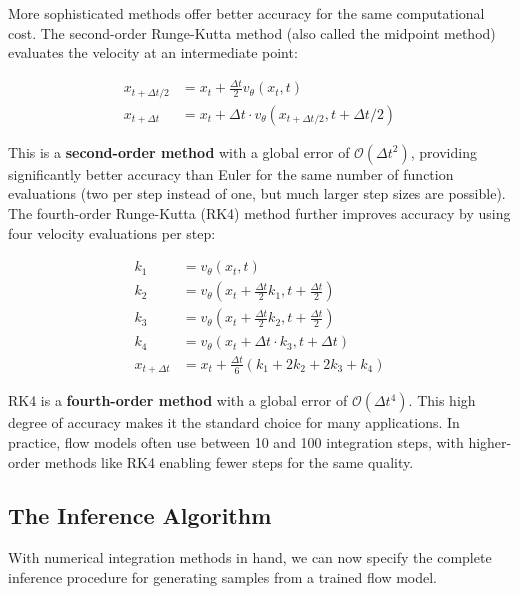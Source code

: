 \documentclass{book}
\begin{document}
More sophisticated methods offer better accuracy for the same computational cost. The second-order Runge-Kutta method (also called the midpoint method) evaluates the velocity at an intermediate point:

\begin{equation}
\begin{aligned}
x_{t + \Delta t/2} &= x_t + \frac{\Delta t}{2} v_\theta(x_t, t) \\
x_{t + \Delta t} &= x_t + \Delta t \cdot v_\theta(x_{t + \Delta t/2}, t + \Delta t/2)
\end{aligned}
\end{equation}

This is a \textbf{second-order method} with a global error of $\mathcal{O}(\Delta t^2)$, providing significantly better accuracy than Euler for the same number of function evaluations (two per step instead of one, but much larger step sizes are possible). The fourth-order Runge-Kutta (RK4) method further improves accuracy by using four velocity evaluations per step:

\begin{equation}
\begin{aligned}
k_1 &= v_\theta(x_t, t) \\
k_2 &= v_\theta(x_t + \frac{\Delta t}{2} k_1, t + \frac{\Delta t}{2}) \\
k_3 &= v_\theta(x_t + \frac{\Delta t}{2} k_2, t + \frac{\Delta t}{2}) \\
k_4 &= v_\theta(x_t + \Delta t \cdot k_3, t + \Delta t) \\
x_{t + \Delta t} &= x_t + \frac{\Delta t}{6}(k_1 + 2k_2 + 2k_3 + k_4)
\end{aligned}
\end{equation}

RK4 is a \textbf{fourth-order method} with a global error of $\mathcal{O}(\Delta t^4)$. This high degree of accuracy makes it the standard choice for many applications. In practice, flow models often use between 10 and 100 integration steps, with higher-order methods like RK4 enabling fewer steps for the same quality.

\subsection{The Inference Algorithm}

With numerical integration methods in hand, we can now specify the complete inference procedure for generating samples from a trained flow model.
\end{document}
